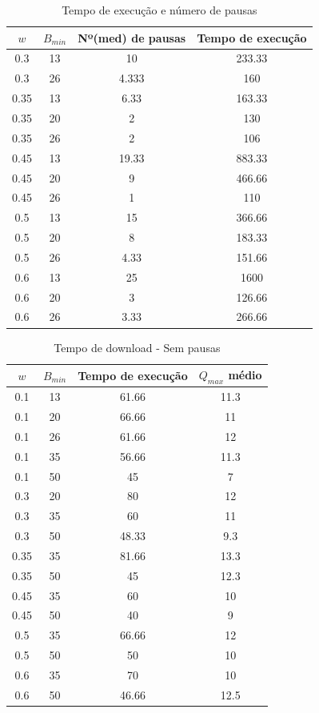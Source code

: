 \documentclass[10pt,twocolumn,letterpaper]{article}
\begin{document}
\begin{table}[]
	\centering
	\begin{tabular}{c|c|c|c}
		$w$ & $B_{min}$ & Nº(med) de pausas & Tempo de execução  \\
		\hline
		0.3 & 13 & 10 & 233.33 \\
		0.3 & 26 & 4.333 & 160 \\
		\hline
		0.35 &	13&	6.33 & 163.33 \\
		0.35 & 20 &	2&	130 \\
		0.35 & 26 & 2 & 106 \\
		\hline
		0.45 & 13 &	19.33 & 883.33\\
		0.45 & 20 & 9 &	466.66\\
		0.45 & 26 & 1 & 110 \\
		\hline
		0.5 & 13 & 15 & 366.66\\
		0.5 & 20 & 8 & 183.33\\
		0.5 & 26 & 4.33 & 151.66\\
		\hline
		0.6	& 13 & 25 & 1600\\	
		0.6	& 20 & 3 & 126.66 \\
		0.6	& 26 & 3.33 & 266.66 \\
	\end{tabular}
	\caption{Tempo de execução e número de pausas}
	\label{table:1}
\end{table}
\begin{table}[]
	\centering
	\begin{tabular}{c|c|c|c}
		$w$ & $B_{min}$  & Tempo de execução & $Q_{max}$ médio \\
		\hline
		0.1 & 13 & 61.66 & 11.3\\
		0.1 & 20 & 66.66 & 11\\
		0.1 & 26 & 61.66 & 12\\
		0.1 & 35 & 56.66 & 11.3 \\
		0.1 & 50 & 45 & 7\\
		\hline
		0.3 & 20 & 80 & 12\\
		0.3 & 35 & 60 & 11\\
		0.3 & 50 & 48.33 & 9.3\\
		\hline
		0.35 & 35 & 81.66 & 13.3\\
		0.35 & 50 & 45 & 12.3\\
		\hline
		0.45 & 35 & 60 & 10\\
		0.45 & 50 & 40 & 9\\
		\hline
		0.5 & 35 & 66.66 & 12\\
		0.5 & 50 & 50 & 10\\
		\hline
		0.6 & 35 & 70 & 10\\
		0.6 & 50 & 46.66 & 12.5\\
	\end{tabular}
	\caption{Tempo de download - Sem pausas}
	\label{table:2}
\end{table}
\end{document}
